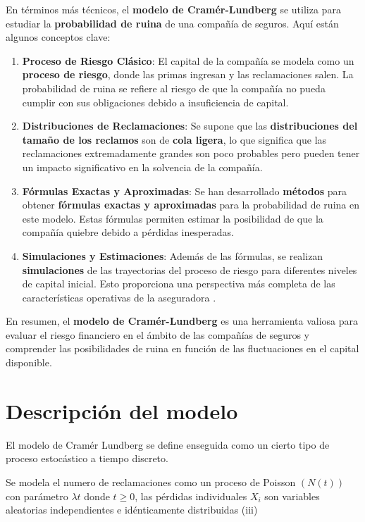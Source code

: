 \documentclass[
  us-letterpaper,
]{scrreprt}
\theoremstyle{plain}
\theoremstyle{plain}
\theoremstyle{definition}
\theoremstyle{remark}
\begin{document}
En términos más técnicos, el \textbf{modelo de Cramér-Lundberg} se
utiliza para estudiar la \textbf{probabilidad de ruina} de una compañía
de seguros. Aquí están algunos conceptos clave:

\begin{enumerate}
\def\labelenumi{\arabic{enumi}.}
\item
  \textbf{Proceso de Riesgo Clásico}: El capital de la compañía se
  modela como un \textbf{proceso de riesgo}, donde las primas ingresan y
  las reclamaciones salen. La probabilidad de ruina se refiere al riesgo
  de que la compañía no pueda cumplir con sus obligaciones debido a
  insuficiencia de capital.
\item
  \textbf{Distribuciones de Reclamaciones}: Se supone que las
  \textbf{distribuciones del tamaño de los reclamos} son de \textbf{cola
  ligera}, lo que significa que las reclamaciones extremadamente grandes
  son poco probables pero pueden tener un impacto significativo en la
  solvencia de la compañía.
\item
  \textbf{Fórmulas Exactas y Aproximadas}: Se han desarrollado
  \textbf{métodos} para obtener \textbf{fórmulas exactas y aproximadas}
  para la probabilidad de ruina en este modelo. Estas fórmulas permiten
  estimar la posibilidad de que la compañía quiebre debido a pérdidas
  inesperadas.
\item
  \textbf{Simulaciones y Estimaciones}: Además de las fórmulas, se
  realizan \textbf{simulaciones} de las trayectorias del proceso de
  riesgo para diferentes niveles de capital inicial. Esto proporciona
  una perspectiva más completa de las características operativas de la
  aseguradora .
\end{enumerate}

En resumen, el \textbf{modelo de Cramér-Lundberg} es una herramienta
valiosa para evaluar el riesgo financiero en el ámbito de las compañías
de seguros y comprender las posibilidades de ruina en función de las
fluctuaciones en el capital disponible.

\section{Descripción del modelo}\label{descripciuxf3n-del-modelo}

El modelo de Cramér Lundberg se define enseguida como un cierto tipo de
proceso estocástico a tiempo discreto.

Se modela el numero de reclamaciones como un proceso de Poisson
\((N(t))\) con parámetro \(\lambda t\) donde \(t\geq 0\), las pérdidas
individuales \(X_i\) son variables aleatorias independientes e
idénticamente distribuidas (iii)
\end{document}
